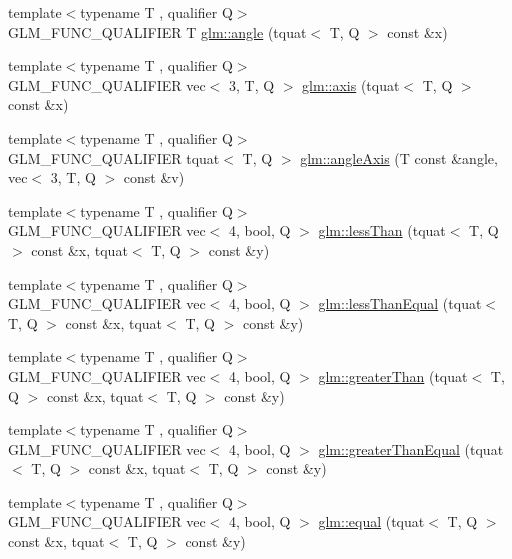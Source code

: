 \begin{DoxyCompactItemize}
\item 
{\footnotesize template$<$typename T , qualifier Q$>$ }\\G\+L\+M\+\_\+\+F\+U\+N\+C\+\_\+\+Q\+U\+A\+L\+I\+F\+I\+ER T \hyperlink{group__gtc__quaternion_gaaee6c856cae3217d274a240238cb6373}{glm\+::angle} (tquat$<$ T, Q $>$ const \&x)
\item 
{\footnotesize template$<$typename T , qualifier Q$>$ }\\G\+L\+M\+\_\+\+F\+U\+N\+C\+\_\+\+Q\+U\+A\+L\+I\+F\+I\+ER vec$<$ 3, T, Q $>$ \hyperlink{group__gtc__quaternion_gaaf2707d3081789ce097daaa6e54d5287}{glm\+::axis} (tquat$<$ T, Q $>$ const \&x)
\item 
{\footnotesize template$<$typename T , qualifier Q$>$ }\\G\+L\+M\+\_\+\+F\+U\+N\+C\+\_\+\+Q\+U\+A\+L\+I\+F\+I\+ER tquat$<$ T, Q $>$ \hyperlink{group__gtc__quaternion_ga93856b8bfcdd5b9a164248df3149476c}{glm\+::angle\+Axis} (T const \&angle, vec$<$ 3, T, Q $>$ const \&v)
\item 
{\footnotesize template$<$typename T , qualifier Q$>$ }\\G\+L\+M\+\_\+\+F\+U\+N\+C\+\_\+\+Q\+U\+A\+L\+I\+F\+I\+ER vec$<$ 4, bool, Q $>$ \hyperlink{group__gtc__quaternion_ga627487c769e33f4b9f318f271b75802c}{glm\+::less\+Than} (tquat$<$ T, Q $>$ const \&x, tquat$<$ T, Q $>$ const \&y)
\item 
{\footnotesize template$<$typename T , qualifier Q$>$ }\\G\+L\+M\+\_\+\+F\+U\+N\+C\+\_\+\+Q\+U\+A\+L\+I\+F\+I\+ER vec$<$ 4, bool, Q $>$ \hyperlink{group__gtc__quaternion_ga9e84617bb109bf2eb7f30d7f4ba07ad4}{glm\+::less\+Than\+Equal} (tquat$<$ T, Q $>$ const \&x, tquat$<$ T, Q $>$ const \&y)
\item 
{\footnotesize template$<$typename T , qualifier Q$>$ }\\G\+L\+M\+\_\+\+F\+U\+N\+C\+\_\+\+Q\+U\+A\+L\+I\+F\+I\+ER vec$<$ 4, bool, Q $>$ \hyperlink{group__gtc__quaternion_ga3f2720e2d77ec39186415f85ecd9cad0}{glm\+::greater\+Than} (tquat$<$ T, Q $>$ const \&x, tquat$<$ T, Q $>$ const \&y)
\item 
{\footnotesize template$<$typename T , qualifier Q$>$ }\\G\+L\+M\+\_\+\+F\+U\+N\+C\+\_\+\+Q\+U\+A\+L\+I\+F\+I\+ER vec$<$ 4, bool, Q $>$ \hyperlink{group__gtc__quaternion_ga293cb3175d9ad290deaf50984716fd44}{glm\+::greater\+Than\+Equal} (tquat$<$ T, Q $>$ const \&x, tquat$<$ T, Q $>$ const \&y)
\item 
{\footnotesize template$<$typename T , qualifier Q$>$ }\\G\+L\+M\+\_\+\+F\+U\+N\+C\+\_\+\+Q\+U\+A\+L\+I\+F\+I\+ER vec$<$ 4, bool, Q $>$ \hyperlink{group__gtc__quaternion_ga22089a76bfb7b45b4c34961bb715e2df}{glm\+::equal} (tquat$<$ T, Q $>$ const \&x, tquat$<$ T, Q $>$ const \&y)

\end{DoxyCompactItemize}
